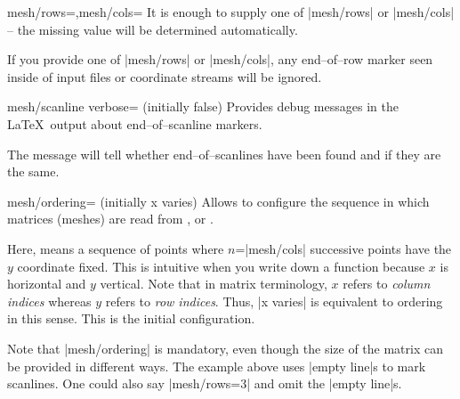 {\begin{pgfplotskeylist}{mesh/rows=,mesh/cols=}
	It is enough to supply one of |mesh/rows| or |mesh/cols| -- the missing value will be determined automatically.
	
	If you provide one of |mesh/rows| or |mesh/cols|, any end--of--row marker seen inside of input files or coordinate streams will be ignored.

\end{pgfplotskeylist}

\begin{pgfplotskeylist}{mesh/scanline verbose= (initially false)}
	Provides debug messages in the \LaTeX\ output about end--of--scanline markers.

	The message will tell whether end--of--scanlines have been found and if they are the same.
\end{pgfplotskeylist}

\begin{pgfplotskey}{mesh/ordering= (initially x varies)}
	Allows to configure the sequence in which matrices (meshes) are read from ,  or .

	Here,  means a sequence of points where $n$=|mesh/cols| successive points have the $y$ coordinate fixed. This is intuitive when you write down a function because $x$ is horizontal and $y$ vertical. Note that in matrix terminology, $x$ refers to \emph{column indices} whereas $y$ refers to \emph{row indices}. Thus, |x varies| is equivalent to  ordering in this sense. This is the initial configuration.
	
\begin{codeexample}[]
\end{codeexample}
	\noindent Note that |mesh/ordering| is mandatory, even though the size of the matrix can be provided in different ways. The example above uses |empty line|s to mark scanlines. One could also say |mesh/rows=3| and omit the |empty line|s.


\end{pgfplotskey}}
